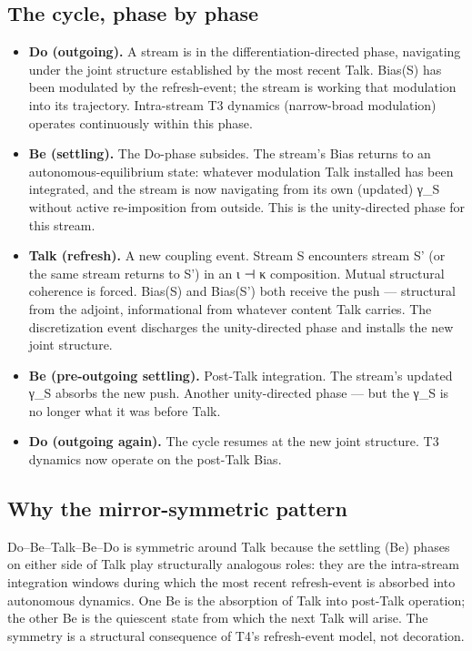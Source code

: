 \documentclass[11pt, openany]{book}
\begin{document}
\subsection{The cycle, phase by phase}

\begin{itemize}
\item \textbf{Do (outgoing).} A stream is in the differentiation-directed phase, navigating under the joint structure established by the most recent Talk. Bias(S) has been modulated by the refresh-event; the stream is working that modulation into its trajectory. Intra-stream T3 dynamics (narrow-broad modulation) operates continuously within this phase.
\item \textbf{Be (settling).} The Do-phase subsides. The stream's Bias returns to an autonomous-equilibrium state: whatever modulation Talk installed has been integrated, and the stream is now navigating from its own (updated) γ\_\allowbreak{}S without active re-imposition from outside. This is the unity-directed phase for this stream.
\item \textbf{Talk (refresh).} A new coupling event. Stream S encounters stream S' (or the same stream returns to S') in an ι ⊣ κ composition. Mutual structural coherence is forced. Bias(S) and Bias(S') both receive the push --- structural from the adjoint, informational from whatever content Talk carries. The discretization event discharges the unity-directed phase and installs the new joint structure.
\item \textbf{Be (pre-outgoing settling).} Post-Talk integration. The stream's updated γ\_\allowbreak{}S absorbs the new push. Another unity-directed phase --- but the γ\_\allowbreak{}S is no longer what it was before Talk.
\item \textbf{Do (outgoing again).} The cycle resumes at the new joint structure. T3 dynamics now operate on the post-Talk Bias.
\end{itemize}

\subsection{Why the mirror-symmetric pattern}

Do–Be–Talk–Be–Do is symmetric around Talk because the settling (Be) phases on either side of Talk play structurally analogous roles: they are the intra-stream integration windows during which the most recent refresh-event is absorbed into autonomous dynamics. One Be is the absorption of Talk into post-Talk operation; the other Be is the quiescent state from which the next Talk will arise. The symmetry is a structural consequence of T4's refresh-event model, not decoration.
\end{document}
